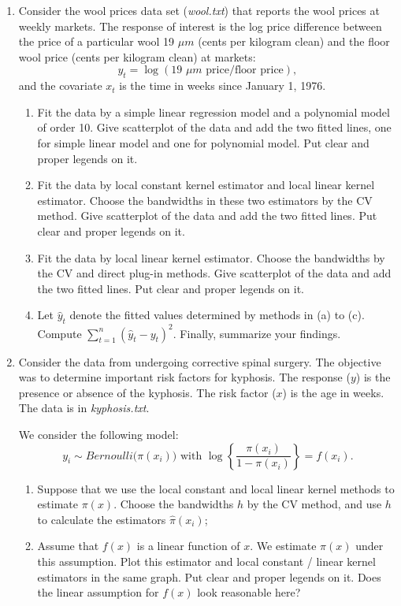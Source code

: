 \documentclass[11pt]{article}
\begin{document}
\begin{enumerate}
\item Consider the wool prices data set ({\it wool.txt}) that reports
the wool prices at weekly markets. 
The response of interest is the log price difference
between the price of a particular wool 19 $\mu m$ (cents per kilogram clean)
and the floor wool price (cents per kilogram clean) at markets: 
$$
y_t=\log(\mbox{19 $\mu m$ price}/\mbox{floor price}),
$$
and the covariate $x_t$ is the time in weeks since January 1, 1976. 
\begin{enumerate}
\item Fit the data by a simple linear regression model and a polynomial model of order 10. 
Give scatterplot of the data and add the two fitted lines, one for simple linear model and one for 
polynomial model. 
Put clear and proper legends on it.  
\item Fit the data by local constant kernel estimator and local linear kernel estimator. 
Choose the bandwidths in these two estimators by the CV method. 
Give scatterplot of the data and add the two fitted lines.
 Put clear and proper legends on it.  
 \item Fit the data by local linear kernel estimator. 
 Choose the bandwidths by the CV and direct plug-in methods. 
 Give scatterplot of the data and add the two fitted lines.
 Put clear and proper legends on it.  
 \item Let $\widehat{y}_t$ denote the fitted values determined by methods in (a) to (c). Compute $\sum \limits_{t=1}^n (\widehat{y}_t - y_t)^2$. Finally, summarize your findings. 
\end{enumerate}

\item Consider the data  from undergoing corrective spinal surgery. 
The objective was to determine important risk factors for kyphosis. 
The response  ($y$)
is the presence or absence of the kyphosis. 
The risk factor ($x$)  is the age in weeks. 
The data is in {\it kyphosis.txt}. 

We consider the following model: 
$$
y_i\sim Bernoulli \Big(\pi(x_{i}) \Big)
\mbox{ with } 
\log\left\{
\frac{\pi(x_{i})}{1-\pi(x_{i})}
\right\}
=f(x_{i}).
$$

\begin{enumerate}
\item Suppose that we use the local constant and local linear kernel methods to estimate $\pi(x)$. 
Choose the bandwidths $h$ by the CV method, and use $h$ to calculate 
the estimators $\widehat{\pi}(x_i)$;
\item Assume that $f(x)$ is a linear function of $x$. We estimate $\pi(x)$ under this assumption.  Plot this estimator and local constant / linear kernel estimators in the same graph. 
Put clear and proper legends 
on it. 
Does the linear assumption for $f(x)$ look reasonable here?
 

\end{enumerate}
\end{enumerate}
\end{document}
